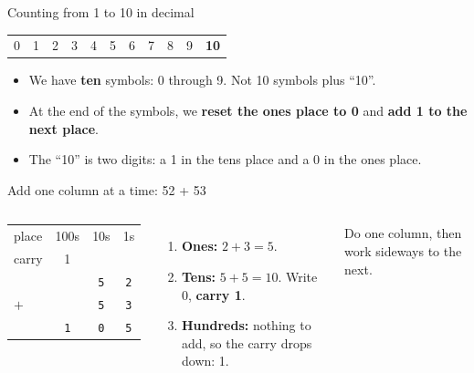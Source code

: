 \documentclass[aspectratio=169,10pt]{beamer}
\newcommand{\gc}[1]{\textcolor{black!60}{\footnotesize #1}}
\begin{document}
\begin{frame}{Counting from 1 to 10 in decimal}
\begin{center}
\begin{tabular}{ccccccccccc}
0&1&2&3&4&5&6&7&8&9&\textbf{10}
\end{tabular}
\end{center}
\begin{itemize}
\item We have \textbf{ten} symbols: 0 through 9. Not 10 symbols plus ``10''.
\item At the end of the symbols, we \textbf{reset the ones place to 0} and \textbf{add 1 to the next place}.
\item The ``10'' is two digits: a 1 in the tens place and a 0 in the ones place.
\end{itemize}
\end{frame}

\begin{frame}{Add one column at a time: 52 + 53}
\begin{columns}[c]
\begin{center}{\huge
\begin{tabular}{@{}l@{\ \ }c@{\ \ }c@{\ \ }c@{}}
\gc{place} & \gc{100s} & \gc{10s} & \gc{1s}\\
\gc{carry} & \gc{1} & & \\
 & & \texttt{5} & \texttt{2}\\
$+$ & & \texttt{5} & \texttt{3}\\\hline
 & \texttt{1} & \texttt{0} & \texttt{5}
\end{tabular}}\end{center}
\begin{enumerate}
\item \textbf{Ones:} $2+3=5$.
\item \textbf{Tens:} $5+5=10$. Write 0, \textbf{carry 1}.
\item \textbf{Hundreds:} nothing to add, so the carry drops down: 1.
\end{enumerate}
Do one column, then work sideways to the next.
\end{columns}
\end{frame}
\end{document}
